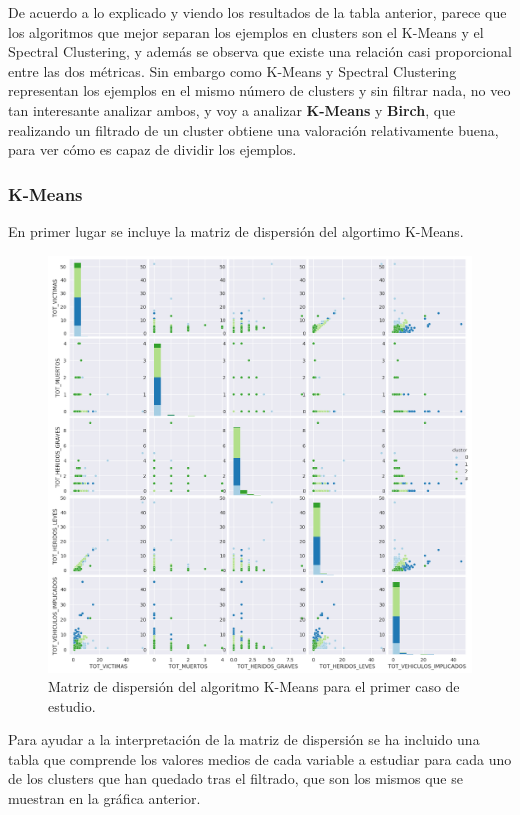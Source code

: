 	De acuerdo a lo explicado y viendo los resultados de la tabla anterior, parece que los algoritmos que mejor separan los ejemplos en clusters son el K-Means y el Spectral Clustering, y además se observa que existe una relación casi proporcional entre las dos métricas. Sin embargo como K-Means y Spectral Clustering representan los ejemplos en el mismo número de clusters y sin filtrar nada, no veo tan interesante analizar ambos, y voy a analizar \textbf{K-Means} y \textbf{Birch}, que realizando un filtrado de un cluster obtiene una valoración relativamente buena, para ver cómo es capaz de dividir los ejemplos.

	\subsubsection{K-Means}
	En primer lugar se incluye la matriz de dispersión del algortimo K-Means.
	
	\begin{figure}[H]
		\centering
		\includegraphics[scale=0.5]{plots/K-Means-HighwayAccidents-ScatterMatrix.png}
		\caption{Matriz de dispersión del algoritmo K-Means para el primer caso de estudio.}
	\end{figure}

	Para ayudar a la interpretación de la matriz de dispersión se ha incluido una tabla que comprende los valores medios de cada variable a estudiar para cada uno de los clusters que han quedado tras el filtrado, que son los mismos que se muestran en la gráfica anterior.

